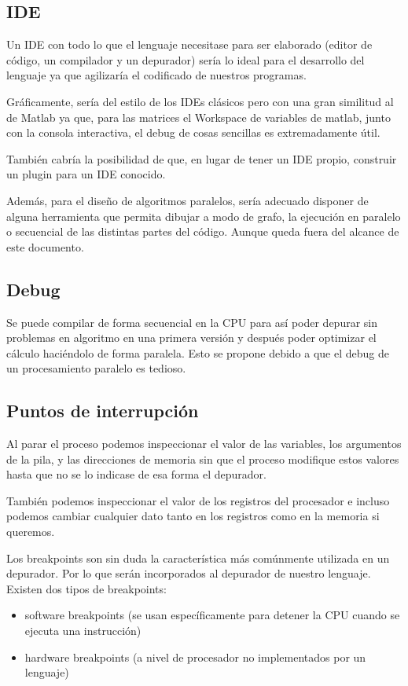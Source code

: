 \documentclass[12pt,a4paper]{article}
\begin{document}
\subsection
{IDE}
Un IDE con todo lo que el lenguaje necesitase para ser elaborado (editor de
código, un compilador y un depurador) sería lo ideal para el desarrollo del
lenguaje ya que agilizaría el codificado de nuestros programas.

Gráficamente, sería del estilo de los IDEs clásicos pero con una gran similitud 
al de Matlab ya que, para las matrices el Workspace de variables de matlab, 
junto con la consola interactiva, el debug de cosas sencillas es extremadamente 
útil.

También cabría la posibilidad de que, en lugar de tener un IDE propio, construir 
un plugin para un IDE conocido.

Además, para el diseño de algoritmos paralelos, sería adecuado disponer de 
alguna herramienta que permita dibujar a modo de grafo, la ejecución en paralelo 
o secuencial de las distintas partes del código. Aunque queda fuera del alcance 
de este documento.


\subsection
{Debug}
Se puede compilar de forma secuencial en la CPU para así poder depurar sin
problemas en algoritmo en una primera versión y después poder optimizar el
cálculo haciéndolo de forma paralela. Esto se propone debido a que el debug de
un procesamiento paralelo es tedioso.


\subsection{Puntos de interrupción}
Al parar el proceso podemos inspeccionar el valor de las variables, los 
argumentos de la pila, y las direcciones de memoria sin que el proceso modifique 
estos valores hasta que no se lo indicase de esa forma el depurador.

También podemos inspeccionar el valor de los registros del procesador e incluso 
podemos cambiar cualquier dato tanto en los registros como en la memoria si 
queremos.

Los breakpoints son sin duda la característica más comúnmente utilizada en un 
depurador. Por lo que serán incorporados al depurador de nuestro lenguaje.  
Existen dos tipos de breakpoints:
\begin{itemize}
\item software breakpoints (se usan específicamente para detener la CPU cuando 
	se ejecuta una instrucción)
\item hardware breakpoints (a nivel de procesador no implementados por un 
	lenguaje)
\end{itemize}
\end{document}
